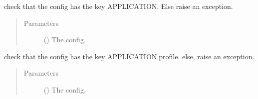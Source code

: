 \documentclass[a4paper,10pt,english]{sphinxmanual}
\begin{document}

\begin{fulllineitems}
\label{\detokenize{commands/apidoc/src:src.check_config_has_application}}
check that the config has the key APPLICATION. Else raise an exception.
\begin{quote}\begin{description}
\item[{Parameters}] \leavevmode
{} () \textendash{} The config.

\end{description}\end{quote}

\end{fulllineitems}


\begin{fulllineitems}
\label{\detokenize{commands/apidoc/src:src.check_config_has_profile}}
check that the config has the key APPLICATION.profile.
else, raise an exception.
\begin{quote}\begin{description}
\item[{Parameters}] \leavevmode
{} () \textendash{} The config.

\end{description}\end{quote}

\end{fulllineitems}


\begin{fulllineitems}
\label{\detokenize{commands/apidoc/src:src.config_has_application}}
\end{fulllineitems}
\end{document}
